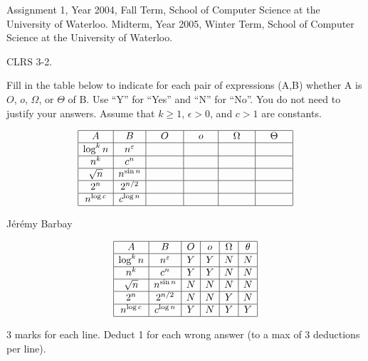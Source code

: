 \begin{usage}
Assignment 1, Year 2004, Fall Term, School of Computer Science at the University of Waterloo.
Midterm, Year 2005, Winter Term, School of Computer Science at the University of Waterloo.
\end{usage}
\begin{authorship}
CLRS 3-2.
\end{authorship}
Fill in the table below to indicate
for each pair of expressions (A,B) 
whether A is $O$, $o$, $\Omega$, or $\Theta$ of B.
Use ``Y'' for ``Yes'' and ``N'' for ``No''.
%
You do not need to justify your answers.
%
Assume that $k \geq 1$, $\epsilon > 0$, and $c > 1$ are
constants. 
%
\begin{spaceForAnswer}
\renewcommand{\arraystretch}{2}
\begin{textOnly}
$$
\begin{array}{|c|c|c|c|c|c|}\hline
  A          &	B               &   \ \ \ O\ \ \    &   \ \ \ o\ \ \    & \ \ \ \Omega\ \ \ &\ \ \ \Theta\ \ \  \\ \hline
 \log^{k}n     &n^{\varepsilon }    	&    	&  	&  	&  	\\ \hline
 n^{k}       &	c^{n}              	&   	&  	&  	&  	\\ \hline
 \sqrt{n}    &	n ^{\sin n}        	&   	&  	&  	&  	\\ \hline
 2^{n}       &	2^{n/2}            	&   	&   	&  	&  	\\ \hline
 n^{\log c}   &	c^{\log n}          	&   	&  	&  	&  	\\ \hline
\end{array}
$$
\end{textOnly}
\end{spaceForAnswer}
\begin{solution}
\begin{authorship}J\'er\'emy Barbay\end{authorship}
$$
\begin{array}{|c|c|c|c|c|c|c|}\hline
  A          &	B               &   O   &   o   & \Omega&\theta \\	\hline
 \log^{k}n     &n^{\varepsilon }  &   Y	&   Y 	&  N	&  N	\\	\hline 
 n^{k}       &	c^{n}           &   Y	&   Y	&  N	&  N	\\	\hline 
 \sqrt{n}    &	n ^{\sin n}     &   N	&   N	&  N	&  N	\\	\hline 
 2^{n}       &	2^{n/2}         &   N 	&   N	&  Y 	&  N	\\	\hline 
 n^{\log c}   &	c^{\log n}       &   Y	&   N	&  Y	&  Y	\\	\hline 
\end{array}
$$
\end{solution}
\begin{markingScheme}
3 marks for each line.  Deduct 1 for each wrong answer (to a max of
3 deductions per line).
\end{markingScheme}


